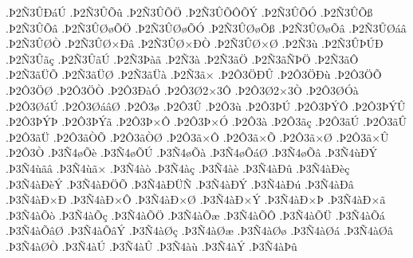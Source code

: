 {.^^de2^^d13^^db^^d0^^e1^^da
.^^de2^^d13^^db^^d5^^fb
.^^de2^^d13^^db^^d5^^d6
.^^de2^^d13^^db^^d5^^d4^^d5^^dd
.^^de2^^d13^^db^^d5^^d3
.^^de2^^d13^^db^^d5^^df
.^^de2^^d13^^db^^d5^^e2
.^^de2^^d13^^db^^d8^^f8^^d5^^d6
.^^de2^^d13^^db^^d8^^f8^^d5^^d3
.^^de2^^d13^^db^^d8^^f8^^d5^^df
.^^de2^^d13^^db^^d8^^f8^^d5^^e2
.^^de2^^d13^^db^^d8^^e1^^e2
.^^de2^^d13^^db^^d8^^d2
.^^de2^^d13^^db^^d8^^d7^^d0^^e2
.^^de2^^d13^^db^^d8^^d7^^d0^^d2
.^^de2^^d13^^db^^d8^^d7^^d8
.^^de2^^d13^^f9
.^^de2^^d13^^db^^de^^da^^d0
.^^de2^^d13^^db^^e3^^e7
.^^de2^^d13^^db^^e3^^da
.^^de2^^d13^^de^^e0^^e3
.^^de2^^d13^^e0
.^^de2^^d13^^e3^^d6
.^^de2^^d13^^e3^^d1^^de^^d6
.^^de2^^d13^^e3^^d4
.^^de2^^d13^^e3^^dc^^d5
.^^de2^^d13^^e3^^dc^^d8
.^^de2^^d13^^e3^^dc^^e0
.^^de2^^d13^^e3^^d7
.^^de2^^d43^^d6^^d0^^db
.^^de2^^d43^^d6^^d0^^f9
.^^de2^^d43^^d6^^d5
.^^de2^^d43^^d6^^d8
.^^de2^^d43^^d6^^d2
.^^de2^^d43^^d0^^e0^^d3
.^^de2^^d43^^d82^^d73^^d4
.^^de2^^d43^^d82^^d73^^d2
.^^de2^^d43^^d8^^d3^^e0
.^^de2^^d43^^d8^^e1^^da
.^^de2^^d43^^d8^^e1^^e2^^d8
.^^de2^^d43^^f8
.^^de2^^d43^^db
.^^de2^^d43^^f9
.^^de2^^d43^^de^^da
.^^de2^^d43^^de^^dd^^d4
.^^de2^^d43^^de^^dd^^db
.^^de2^^d43^^de^^dd^^de
.^^de2^^d43^^de^^dd^^e3
.^^de2^^d43^^de^^d7^^d4
.^^de2^^d43^^de^^d7^^d3
.^^de2^^d43^^e0
.^^de2^^d43^^e3^^e7
.^^de2^^d43^^e3^^da
.^^de2^^d43^^e3^^db
.^^de2^^d43^^e3^^dc
.^^de2^^d43^^e3^^d2^^d5
.^^de2^^d43^^e3^^d2^^d8
.^^de2^^d43^^e3^^d7^^d4
.^^de2^^d43^^e3^^d7^^d5
.^^de2^^d43^^e3^^d7^^d8
.^^de2^^d43^^e3^^d7^^db
.^^de2^^d43^^d2
.^^de3^^d14^^f8^^d5^^e8
.^^de3^^d14^^f8^^d5^^da
.^^de3^^d14^^f8^^d5^^e0
.^^de3^^d14^^f8^^d5^^e1^^d8
.^^de3^^d14^^f8^^d5^^e2
.^^de3^^d14^^f9^^d0^^dd
.^^de3^^d14^^f9^^e3^^e2
.^^de3^^d14^^f9^^e3^^d7
.^^de3^^d14^^e0^^f2
.^^de3^^d14^^e0^^e7
.^^de3^^d14^^e0^^e8
.^^de3^^d14^^e0^^d0^^fb
.^^de3^^d14^^e0^^d0^^e8^^e7
.^^de3^^d14^^e0^^d0^^e8^^dd
.^^de3^^d14^^e0^^d0^^d6^^d5
.^^de3^^d14^^e0^^d0^^dc^^d1
.^^de3^^d14^^e0^^d0^^dd
.^^de3^^d14^^e0^^d0^^fa
.^^de3^^d14^^e0^^d0^^e2
.^^de3^^d14^^e0^^d0^^d7^^d0
.^^de3^^d14^^e0^^d0^^d7^^d4
.^^de3^^d14^^e0^^d0^^d7^^d8
.^^de3^^d14^^e0^^d0^^d7^^dd
.^^de3^^d14^^e0^^d0^^d7^^de
.^^de3^^d14^^e0^^d0^^d7^^e3
.^^de3^^d14^^e0^^d5^^f2
.^^de3^^d14^^e0^^d5^^e7
.^^de3^^d14^^e0^^d5^^d6
.^^de3^^d14^^e0^^d5^^e6
.^^de3^^d14^^e0^^d5^^d4
.^^de3^^d14^^e0^^d5^^dc
.^^de3^^d14^^e0^^d5^^e1
.^^de3^^d14^^e0^^d5^^e2^^d8
.^^de3^^d14^^e0^^d5^^e2^^dd
.^^de3^^d14^^e0^^d8^^e7
.^^de3^^d14^^e0^^d8^^e6
.^^de3^^d14^^e0^^d8^^f8
.^^de3^^d14^^e0^^d8^^e1
.^^de3^^d14^^e0^^d8^^e2
.^^de3^^d14^^e0^^d8^^d2
.^^de3^^d14^^e0^^da
.^^de3^^d14^^e0^^db
.^^de3^^d14^^e0^^f9
.^^de3^^d14^^e0^^dd
.^^de3^^d14^^e0^^de^^fb
}
